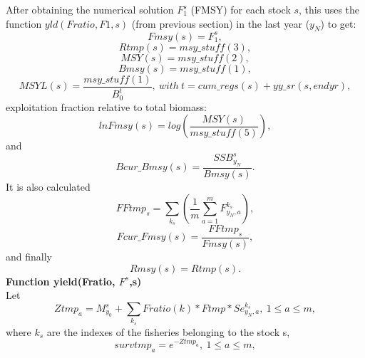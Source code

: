 \documentclass{article}
\begin{document}
After obtaining the numerical solution $F_1^s$ (FMSY) for each stock $s$, this uses the function $yld(Fratio, F1,s)$ (from previous section) in the last year ($y_N$) to get:
\begin{equation}
    Fmsy(s)=F_1^s,
\end{equation}
\begin{equation}
    Rtmp(s)=msy\_stuff(3),
\end{equation}
\begin{equation}
    MSY(s)=msy\_stuff(2),
\end{equation}
\begin{equation}
    Bmsy(s)=msy\_stuff(1),
\end{equation}
\begin{equation}
    MSYL(s)=\dfrac{msy\_stuff(1)}{B_0^t},\ with \ t=cum\_regs(s)+yy\_sr(s,endyr),
\end{equation}
exploitation fraction relative to total biomass:
\begin{equation}
    lnFmsy(s)   = log\left(\dfrac{MSY(s)}{msy\_stuff(5)}\right),
\end{equation}
and
\begin{equation}
    Bcur\_Bmsy(s)= \dfrac{SSB^s_{y_N}}{Bmsy(s)}.
\end{equation}
It is also calculated
\begin{equation}
    FFtmp_s=\sum_{k_s}\left(\dfrac{1}{m}\sum_{a=1}^mF^{k_s}_{y_N,a}\right),
\end{equation}
\begin{equation}
    Fcur\_Fmsy(s)= \dfrac{FFtmp_s}{Fmsy(s)},
\end{equation}
and finally
\begin{equation}
    Rmsy(s)     = Rtmp(s).
\end{equation}
\textbf{Function yield(Fratio, $F^s$,s)} \\

Let
\begin{equation}
    Ztmp_a=M^s_{y_0}+\sum_{k_s}Fratio(k)*Ftmp*Se^{k_s}_{y_N,a}, \ 1\leq a \leq m, 
\end{equation}
where $k_s$ are the indexes of the fisheries belonging to the stock s,
\begin{equation}
    survtmp_a=e^{-Ztmp_a}, \ 1\leq a \leq m,
\end{equation}
\end{document}
